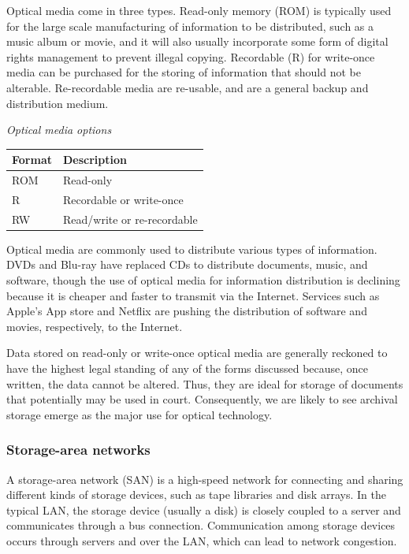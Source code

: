 \documentclass[
]{article}
\begin{document}
Optical media come in three types. Read-only memory (ROM) is typically
used for the large scale manufacturing of information to be distributed,
such as a music album or movie, and it will also usually incorporate
some form of digital rights management to prevent illegal copying.
Recordable (R) for write-once media can be purchased for the storing of
information that should not be alterable. Re-recordable media are
re-usable, and are a general backup and distribution medium.

\emph{Optical media options}

\begin{longtable}[]{@{}ll@{}}
\toprule
Format & Description \\
\midrule
\endhead
ROM & Read-only \\
R & Recordable or write-once \\
RW & Read/write or re-recordable \\
\bottomrule
\end{longtable}

Optical media are commonly used to distribute various types of
information. DVDs and Blu-ray have replaced CDs to distribute documents,
music, and software, though the use of optical media for information
distribution is declining because it is cheaper and faster to transmit
via the Internet. Services such as Apple's App store and Netflix are
pushing the distribution of software and movies, respectively, to the
Internet.

Data stored on read-only or write-once optical media are generally
reckoned to have the highest legal standing of any of the forms
discussed because, once written, the data cannot be altered. Thus, they
are ideal for storage of documents that potentially may be used in
court. Consequently, we are likely to see archival storage emerge as the
major use for optical technology.

\hypertarget{storage-area-networks}{%
\subsubsection*{Storage-area networks}\label{storage-area-networks}}

A storage-area network (SAN) is a high-speed network for connecting and
sharing different kinds of storage devices, such as tape libraries and
disk arrays. In the typical LAN, the storage device (usually a disk) is
closely coupled to a server and communicates through a bus connection.
Communication among storage devices occurs through servers and over the
LAN, which can lead to network congestion.
\end{document}
